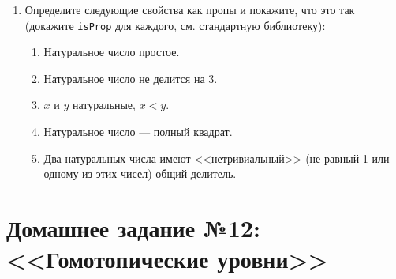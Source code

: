 \documentclass[10pt,a4paper,oneside]{article}
\begin{document}
\begin{enumerate}
\url{https://arend-lang.github.io/documentation/tutorial/PartI/universes.html}

Рассмотрим определения:
\begin{verbatim}
\func ChurchT (x : \Type) => (x -> x) -> (x -> x)
\func Church => \Pi (x : \Type) -> ChurchT x
\func Zero : Church => \lam t f x => x

\func incT (t : \Type) (n : ChurchT t) => \lam f x => n f (f x)
\func pair_plus (type : \Type) (pair : \Sigma (ChurchT type) (ChurchT type)) :
  \Sigma (ChurchT type) (ChurchT type) => (pair.2, incT type pair.2)
\func dec (n : Church) : Church => \lam (t : \Type) =>
    (n (\Sigma (ChurchT t) (ChurchT t)) (pair_plus t) (Zero t, Zero t)).1
\func sub (a : Church (\suc\lp)) (b : Church) => a (Church \lp) dec b
\end{verbatim}

Определите, развивая определения выше:
\begin{enumerate}
\item Операцию умножения.
\item Операцию <<деление на три>> (естественно, в версии, не использующей $Y$-комбинатор).
\item Операцию возведения в степень, определявшуюся как $\lambda m.\lambda n.n\ m$.
\item Деление.
\item Вычисление факториала.
\end{enumerate}

\item Определите следующие свойства как пропы и покажите, что это так (докажите \verb!isProp! для каждого,
см. стандартную библиотеку):
\begin{enumerate}
\item Натуральное число простое.
\item Натуральное число не делится на 3.
\item $x$ и $y$ натуральные, $x < y$.
\item Натуральное число --- полный квадрат.
\item Два натуральных числа имеют <<нетривиальный>> (не равный 1 или одному из этих чисел) общий делитель.
\end{enumerate}
\end{enumerate}

\section*{Домашнее задание №12: <<Гомотопические уровни>>}
\end{document}
